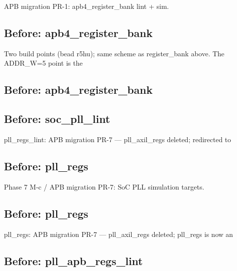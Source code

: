 \begin{record}
\begin{textblock}
APB migration PR-1: apb4_register_bank lint + sim.
\end{textblock}

\subsection*{Before: apb4\_register\_bank}

\begin{textblock}
Two build points (bead r5hu); same scheme as register_bank above.  The ADDR_W=5 point is the
\end{textblock}

\subsection*{Before: apb4\_register\_bank}


\subsection*{Before: soc\_pll\_lint}

\begin{textblock}
pll_regs_lint: APB migration PR-7 — pll_axil_regs deleted; redirected to
\end{textblock}

\subsection*{Before: pll\_regs}

\begin{textblock}
Phase 7 M-c / APB migration PR-7: SoC PLL simulation targets.
\end{textblock}

\subsection*{Before: pll\_regs}

\begin{textblock}
pll_regs: APB migration PR-7 — pll_axil_regs deleted; pll_regs is now an
\end{textblock}

\subsection*{Before: pll\_apb\_regs\_lint}


\end{record}
